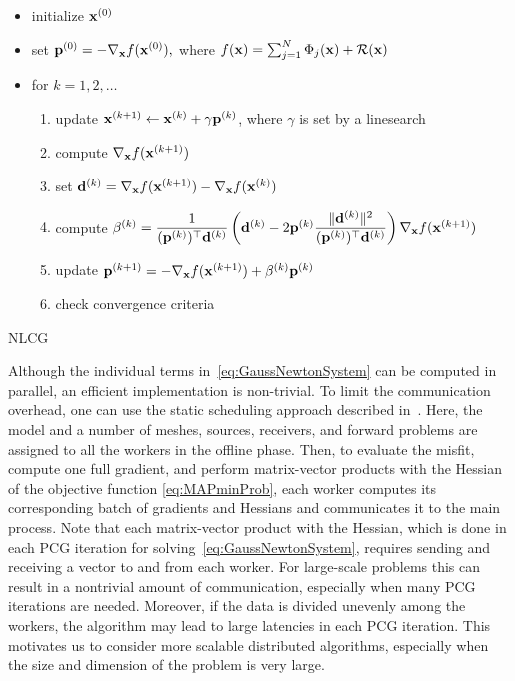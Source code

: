 \documentclass[11pt]{article}          %
\newcommand{\bfd}{{\bf d}}
\newcommand{\bfx}{{\bf  x}}
\newcommand{\bfp}{{\bf p}}
\begin{document}
\begin{algorithm}[t]
  \begin{itemize}
    \item initialize $\bfx^{(0)}$
    \item set $\bfp^{(0)} = - \nabla_\bfx f(\bfx^{(0)}),$ where $f(\bfx) = \sum_{j=1}^N \Phi_j(\bfx) + \mathcal{R}(\bfx)$
    \item for $k=1,2,\ldots$
    \begin{enumerate}
      \item update $\bfx^{(k+1)} \leftarrow \bfx^{(k)} + \gamma \bfp^{(k)}$, where $\gamma$ is set by a linesearch
      \item compute $\nabla_\bfx f(\bfx^{(k+1)})$
      \item set $\bfd^{(k)} = \nabla_\bfx f(\bfx^{(k+1)}) - \nabla_\bfx f(\bfx^{(k)})$
      \item compute $\beta^{(k)} = \dfrac{1}{(\bfp^{(k)})^\top \bfd^{(k)}} \left(\bfd^{(k)} - 2\bfp^{(k)} \dfrac{\| \bfd^{(k)} \|^2}{(\bfp^{(k)})^\top \bfd^{(k)}}\right) \nabla_\bfx f(\bfx^{(k+1)})$
      \item update $\bfp^{(k+1)} = -\nabla_\bfx f(\bfx^{(k+1)}) + \beta^{(k)}\bfp^{(k)}$
      \item check convergence criteria
    \end{enumerate}
  \end{itemize}
 \caption{NLCG}
 \label{alg:NLCG}
\end{algorithm}
Although the individual terms in~\eqref{eq:GaussNewtonSystem} can be computed in parallel, an efficient implementation is non-trivial. To limit the communication overhead, one can use  the static scheduling approach described in~\cite{ruthotto2017jinv}.
Here, the model and a number of meshes, sources, receivers, and forward problems are assigned to all the workers in the offline phase. Then, to evaluate the misfit, compute one full gradient, and perform matrix-vector products with the Hessian of the objective function \eqref{eq:MAPminProb}, each worker computes its corresponding batch of gradients and Hessians and communicates it to the main process. Note that each matrix-vector product with the Hessian, which is done in each PCG iteration for solving~\eqref{eq:GaussNewtonSystem}, requires sending and receiving a vector to and from each worker. For large-scale problems this can result in a nontrivial amount of communication, especially when many PCG iterations are needed. Moreover, if the data is  divided unevenly among the workers, the algorithm may lead to large latencies in each PCG iteration. This motivates us to consider more scalable distributed algorithms, especially when the size and dimension of the problem is very large.
\end{document}
